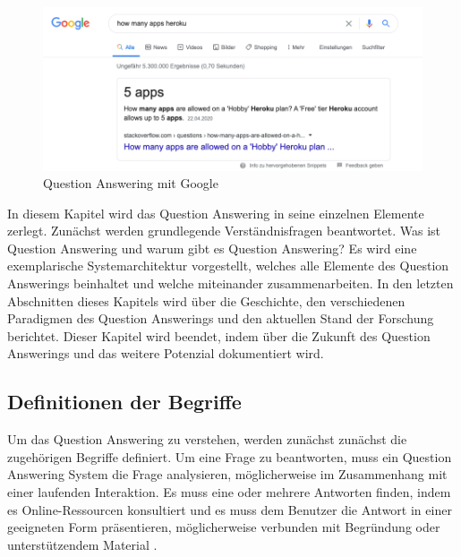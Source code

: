 \documentclass[
        ngerman,
        paper=a4,
        numbers=noendperiod,
]{scrreprt}
\begin{document}
\begin{figure}[H]
    \centering\includegraphics[width=1\linewidth]{images/google.png}
    \caption[Question Answering mit Google]{Question Answering mit Google}
    \label{fig:google}
\end{figure}

In diesem Kapitel wird das Question Answering in seine einzelnen Elemente zerlegt. Zunächst werden grundlegende Verständnisfragen beantwortet. Was ist Question Answering und warum gibt es Question Answering?
Es wird eine exemplarische Systemarchitektur vorgestellt, welches alle Elemente des Question Answerings beinhaltet und welche miteinander zusammenarbeiten. 
In den letzten Abschnitten dieses Kapitels wird über die Geschichte, den verschiedenen Paradigmen des Question Answerings und den aktuellen Stand der Forschung berichtet. Dieser Kapitel wird beendet, indem über die Zukunft des Question Answerings und das weitere Potenzial dokumentiert wird.
\subsection{Definitionen der Begriffe}
Um das Question Answering zu verstehen, werden zunächst zunächst die zugehörigen Begriffe definiert. Um eine Frage zu beantworten, muss ein Question Answering System die Frage analysieren, möglicherweise im Zusammenhang mit einer laufenden Interaktion. Es muss eine oder mehrere Antworten finden, indem es Online-Ressourcen konsultiert und es muss dem Benutzer die Antwort in einer geeigneten Form präsentieren, möglicherweise verbunden mit Begründung oder unterstützendem Material \citep[S. 276]{Hirschman2001NaturalHere}. 
\end{document}
